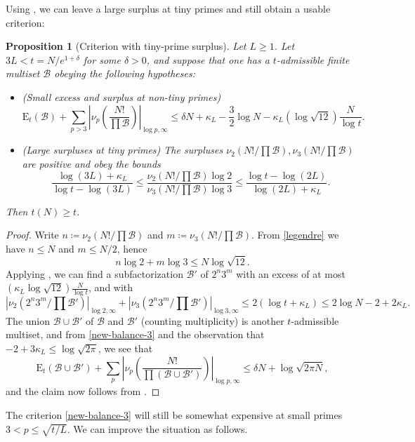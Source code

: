 \documentclass[12pt,a4paper,reqno]{amsart}
\numberwithin{equation}{section}
\theoremstyle{plain}
\newtheorem{proposition}[theorem]{Proposition}
\theoremstyle{definition}
\newcommand\tuple{{\mathcal B}}
\newcommand\excess{{\mathrm{E}}}
\begin{document}
Using , we can leave a large surplus at tiny primes and still obtain a usable criterion:

\begin{proposition}[Criterion with tiny-prime surplus]\label{balance-23}  Let $L \geq 1$.
  Let $3L < t = N/e^{1+\delta}$ for some $\delta>0$, and suppose that one has a $t$-admissible finite multiset $\tuple$ obeying the following hypotheses:
\begin{itemize}
  \item[(i)] (Small excess and surplus at non-tiny primes)
  \begin{equation}\label{new-balance-3}
    \excess_t(\tuple) + \sum_{p>3} \left|\nu_p\left(\frac{N!}{\prod \tuple}\right)\right|_{\log p,\infty} \leq \delta N + \kappa_L - \frac{3}{2} \log N - \kappa_L (\log \sqrt{12}) \frac{N}{\log t}.
  \end{equation}
  \item[(ii)] (Large surpluses at tiny primes)
The surpluses $\nu_2(N!/\prod \tuple), \nu_3(N!/\prod \tuple)$ are positive and obey the bounds
$$
\frac{\log(3L)+\kappa_L}{\log t - \log(3L)} \leq \frac{\nu_2(N!/\prod \tuple) \log 2}{\nu_3(N!/\prod \tuple) \log 3} \leq \frac{\log t - \log(2L)}{\log(2L)+\kappa_L}.
$$
\end{itemize}
Then $t(N) \geq t$.
\end{proposition}
  

\begin{proof} Write $n \coloneqq \nu_2(N!/\prod \tuple)$ and $m \coloneqq \nu_3(N!/\prod \tuple)$.  From \eqref{legendre} we have $n \leq N$ and $m \leq N/2$, hence
  $$ n \log 2 + m \log 3 \leq N \log \sqrt{12}.$$
Applying , we can find a subfactorization $\tuple'$ of $2^n 3^m$ with an excess of at most $(\kappa_L \log \sqrt{12}) \frac{N}{\log t}$, and with
$$ |\nu_2(2^n 3^m/\prod \tuple')|_{\log 2,\infty}
+ |\nu_3(2^n 3^m/\prod \tuple')|_{\log 3,\infty}
 \leq 2(\log t + \kappa_L) \leq 2 \log N - 2 + 2 \kappa_L.$$
 The  union $\tuple \cup \tuple'$ of $\tuple$ and $\tuple'$ (counting multiplicity) is another $t$-admissible multiset, and from \eqref{new-balance-3} and the observation that $-2+3\kappa_L \leq \log \sqrt{2\pi}$, we see that
 $$
 \excess_t(\tuple \cup \tuple') + \sum_{p} \left|\nu_p\left(\frac{N!}{\prod(\tuple \cup \tuple')}\right)\right|_{\log p,\infty} \leq \delta N + \log \sqrt{2\pi N},$$
 and the claim now follows from .
\end{proof}

The criterion \eqref{new-balance-3} will still be somewhat expensive at small primes $3 < p \leq \sqrt{t/L}$.  We can improve the situation as follows.
\end{document}
